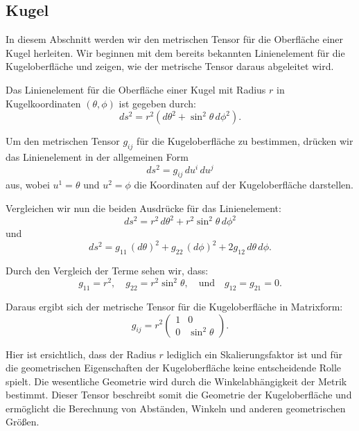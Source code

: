 %
%
%
%
\subsection{Kugel\label{geodaeten:section:MetKugel}}

In diesem Abschnitt werden wir den metrischen Tensor für die Oberfläche einer Kugel herleiten.
Wir beginnen mit dem bereits bekannten Linienelement für die Kugeloberfläche und zeigen, wie der metrische Tensor daraus abgeleitet wird.

Das Linienelement für die Oberfläche einer Kugel mit Radius $r$ in Kugelkoordinaten $(\theta, \phi)$ ist gegeben durch:
\begin{equation}
	ds^2 = r^2 \left( d\theta^2 + \sin^2\theta \, d\phi^2 \right).
\end{equation}

Um den metrischen Tensor $g_{ij}$ für die Kugeloberfläche zu bestimmen, drücken wir das Linienelement in der allgemeinen Form
\begin{equation}
	ds^2 = g_{ij} \, du^i \, du^j
\end{equation}
aus, wobei $u^1 = \theta$ und $u^2 = \phi$ die Koordinaten auf der Kugeloberfläche darstellen.

Vergleichen wir nun die beiden Ausdrücke für das Linienelement:
\begin{equation}
	ds^2 = r^2 \, d\theta^2 + r^2 \sin^2\theta \, d\phi^2
\end{equation}
und
\begin{equation}
	ds^2 = g_{11} \, (d\theta)^2 + g_{22} \, (d\phi)^2 + 2g_{12} \, d\theta \, d\phi.
\end{equation}

Durch den Vergleich der Terme sehen wir, dass:
\begin{equation}
	g_{11} = r^2, \quad g_{22} = r^2 \sin^2\theta, \quad \text{und} \quad g_{12} = g_{21} = 0.
\end{equation}

Daraus ergibt sich der metrische Tensor für die Kugeloberfläche in Matrixform:
\begin{equation}
	g_{ij} = r^2 \begin{pmatrix}
		1 & 0 \\
		0 & \sin^2\theta
	\end{pmatrix}.
\end{equation}

Hier ist ersichtlich, dass der Radius $r$ lediglich ein Skalierungsfaktor ist und für die geometrischen Eigenschaften der Kugeloberfläche keine entscheidende Rolle spielt. 
Die wesentliche Geometrie wird durch die Winkelabhängigkeit der Metrik bestimmt.
Dieser Tensor beschreibt somit die Geometrie der Kugeloberfläche und ermöglicht die Berechnung von Abständen, Winkeln und anderen geometrischen Größen.





